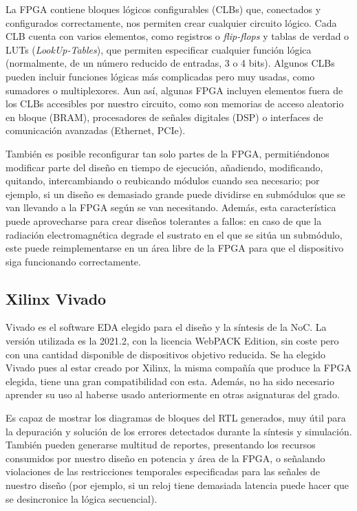 La FPGA contiene bloques lógicos configurables (CLBs) que, conectados y configurados correctamente, nos permiten crear cualquier circuito lógico. Cada CLB cuenta con varios elementos, como registros o \textit{flip-flops} y tablas de verdad o LUTs (\textit{LookUp-Tables}), que permiten especificar cualquier función lógica (normalmente, de un número reducido de entradas, 3 o 4 bits). Algunos CLBs pueden incluir funciones lógicas más complicadas pero muy usadas, como sumadores o multiplexores. Aun así, algunas FPGA incluyen elementos fuera de los CLBs accesibles por nuestro circuito, como son memorias de acceso aleatorio en bloque (BRAM), procesadores de señales digitales (DSP)  o interfaces de comunicación avanzadas (Ethernet, PCIe).

También es posible reconfigurar tan solo partes de la FPGA, permitiéndonos modificar parte del diseño en tiempo de ejecución,
añadiendo, modificando, quitando, intercambiando o reubicando módulos cuando sea necesario; por ejemplo, si un diseño es demasiado grande puede dividirse en submódulos que se van llevando a la FPGA según se van necesitando. Además, esta característica puede aprovecharse para crear diseños tolerantes a fallos: en caso de que la radiación electromagnética degrade el sustrato en el que se sitúa un submódulo, este puede reimplementarse en un área libre de la FPGA para que el dispositivo siga funcionando correctamente.

\subsection{Xilinx Vivado}

Vivado es el software EDA elegido para el diseño y la síntesis de la NoC. La versión utilizada es la 2021.2, con la licencia WebPACK Edition, sin coste pero con una cantidad disponible de dispositivos objetivo reducida.
Se ha elegido Vivado pues al estar creado por Xilinx, la misma compañía que produce la FPGA elegida, tiene una gran compatibilidad con esta. Además, no ha sido necesario aprender su uso al haberse usado anteriormente en otras asignaturas del grado.

Es capaz de mostrar los diagramas de bloques del RTL generados, muy útil para la depuración y solución de los errores detectados durante la síntesis y simulación. También pueden generarse multitud de reportes, presentando los recursos consumidos por nuestro diseño en potencia y área de la FPGA, o señalando violaciones de las restricciones temporales especificadas para las señales de nuestro diseño (por ejemplo, si un reloj tiene demasiada latencia puede hacer que se desincronice la lógica secuencial).

